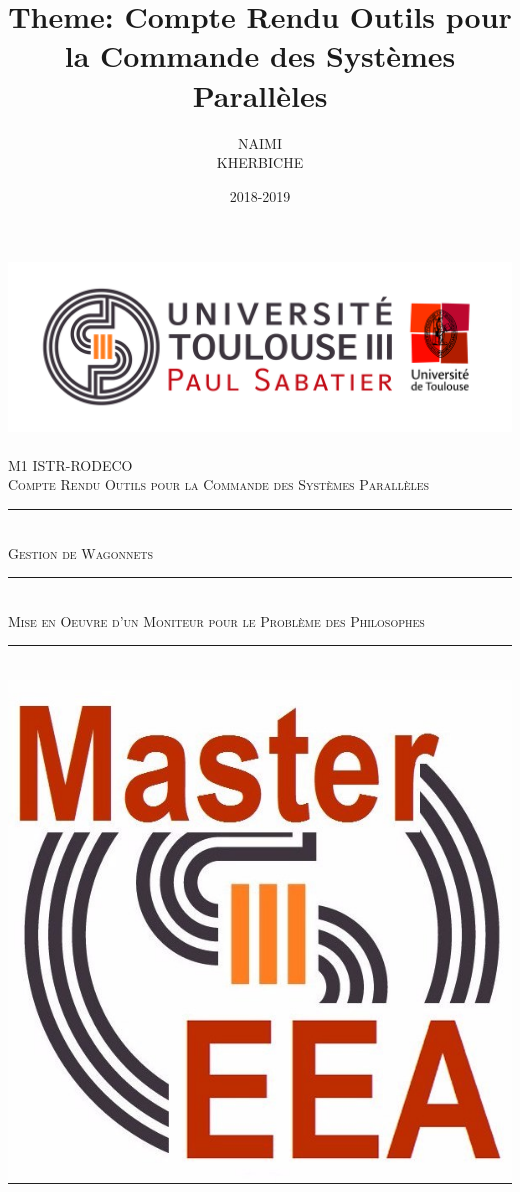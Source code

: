 \documentclass[12pt, a4paper, openany]{report}
\title{Theme: Compte Rendu Outils pour la Commande des Systèmes Parallèles}
\author{NAIMI \bsc{Nabil} \\ KHERBICHE \bsc{Ali}}
\date{2018-2019}
\newcommand{\HRule}{\rule{\linewidth}{0.5mm}}
\begin{document}
\makeatletter
\begin{titlepage}
\begin{sffamily}
\begin{center}
    \includegraphics[scale=0.5]{Logo_UT3.jpg}~\\[1cm]
    \textsc{\LARGE M1 ISTR-RODECO  }\\[1cm]
    \textsc{\Large Compte Rendu Outils pour la Commande des Systèmes Parallèles}\\[1cm]
    \HRule \\[0.4cm] %
    { \huge  \textsc {Gestion de Wagonnets\\[0.4cm] }}
	\HRule \\[0.4cm] %
	{ \huge  \textsc {Mise en Oeuvre d'un Moniteur pour le Problème des Philosophes \\[0.4cm] }}
    \HRule \\[1cm]   %
    \includegraphics[scale=0.1]{logomaster.jpg}

\end{center}
\end{sffamily}
\end{titlepage}
\end{document}
